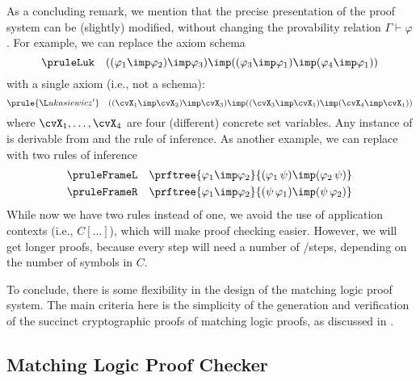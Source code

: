 \documentclass{article}
\begin{document}
As a concluding remark, we mention that the precise presentation of
the proof system can be (slightly) modified, without changing the provability relation $\Gamma \vdash \varphi$.
For example,
we can replace the \pruleLuk axiom schema
\[
\pruleLuk
\quad
((\varphi_1 \imp \varphi_2) \imp \varphi_3)
   \imp ((\varphi_3 \imp \varphi_1) \imp (\varphi_4 \imp \varphi_1))
\]
with a single axiom (i.e., not a schema):
\[
\prule{Łukasiewicz'}
\quad
((\cvX_1 \imp \cvX_2) \imp \cvX_3)
   \imp ((\cvX_3 \imp \cvX_1) \imp (\cvX_4 \imp \cvX_1))
\]
where $\cvX_1,\dots,\cvX_4$ are four (different) concrete set variables.
Any instance of \pruleLuk is derivable from 
and the \pruleSubst rule of inference.
As another example, we can replace
\pruleFrame with two rules of inference
\begin{align*}
\pruleFrameL\quad
  & \prftree{\varphi_1 \imp \varphi_2}
            {(\varphi_1 \, \psi) \imp (\varphi_2 \, \psi)}
\\
\pruleFrameR\quad
  & \prftree{\varphi_1 \imp \varphi_2}
            {(\psi \, \varphi_1) \imp (\psi \, \varphi_2)}
\end{align*}
While now we have two rules instead of one,
we avoid the use of application contexts (i.e., $C[\dots]$),
which will make proof checking easier.
However, we will get longer proofs, because every \pruleFrame step
will need a number of \pruleFrameL/\pruleFrameL steps,
depending on the number of symbols in $C$.

To conclude, there is some flexibility in the design of the matching logic proof system.
The main criteria here is the simplicity of the generation and verification
of the succinct cryptographic proofs of matching logic proofs,
as discussed in .

\subsection{Matching Logic Proof Checker}
\label{sec:ml_proof_checker}
\end{document}
